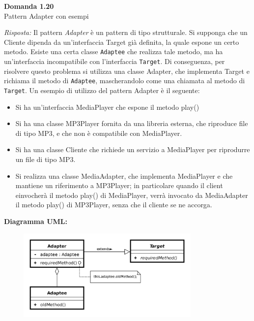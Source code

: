 \documentclass{article}
\newenvironment{problem}[2][Domanda]
    { \begin{mdframed}[backgroundcolor=gray!20] \textbf{#1 #2} \\}
    {  \end{mdframed}}
\newenvironment{solution}
    {\textit{Risposta:}}
    {}
\begin{document}
\begin{problem}{1.20}
Pattern Adapter con esempi
\end{problem}
\begin{solution}
Il pattern \textit{Adapter} è un pattern di tipo strutturale.
Si supponga che un Cliente dipenda da un'interfaccia Target già definita, la quale espone un certo metodo.
Esiste una certa classe \texttt{Adaptee} che realizza tale metodo, ma ha un'interfaccia incompatibile con l'interfaccia \texttt{Target}.
Di conseguenza, per risolvere questo problema si utilizza una classe Adapter, che implementa Target e richiama il metodo di \texttt{Adaptee}, mascherandolo come una chiamata al metodo di \texttt{Target}.
Un esempio di utilizzo del pattern Adapter è il seguente:
\begin{itemize}
	\item Si ha un'interfaccia MediaPlayer che espone il metodo play()
	\item Si ha una classe MP3Player fornita da una libreria esterna, che riproduce file di tipo MP3, e che non è compatibile con MediaPlayer.
	\item Si ha una classe Cliente che richiede un servizio a MediaPlayer per riprodurre un file di tipo MP3.
	\item Si realizza una classe MediaAdapter, che implementa MediaPlayer e che mantiene un riferimento a MP3Player; in particolare quando il client einvocherà il metodo play() di MediaPlayer, verrà invocato da MediaAdapter il metodo play() di MP3Player, senza che il cliente se ne accorga.

\end{itemize}
\textbf{Diagramma UML:}
\begin{figure}[htb!]
	\centering
	\label{ObserverPattern}
	\includegraphics[width=9cm]{./immagini/adapterPattern.png}
\end{figure}
\end{solution}
\end{document}
